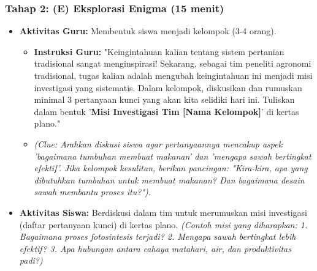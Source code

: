 \documentclass[a4paper,12pt]{article}
\begin{document}
\subsubsection{Tahap 2: (E) Eksplorasi Enigma (15 menit)}
\begin{itemize}
\item \textbf{Aktivitas Guru:} Membentuk siswa menjadi kelompok (3-4 orang).
    \begin{itemize}
    \item \textbf{Instruksi Guru:} "Keingintahuan kalian tentang sistem pertanian tradisional sangat menginspirasi! Sekarang, sebagai tim peneliti agronomi tradisional, tugas kalian adalah mengubah keingintahuan ini menjadi misi investigasi yang sistematis. Dalam kelompok, diskusikan dan rumuskan minimal 3 pertanyaan kunci yang akan kita selidiki hari ini. Tuliskan dalam bentuk '\textbf{Misi Investigasi Tim [Nama Kelompok]}' di kertas plano."
    \item \textit{(Clue: Arahkan diskusi siswa agar pertanyaannya mencakup aspek 'bagaimana tumbuhan membuat makanan' dan 'mengapa sawah bertingkat efektif'. Jika kelompok kesulitan, berikan pancingan: "Kira-kira, apa yang dibutuhkan tumbuhan untuk membuat makanan? Dan bagaimana desain sawah membantu proses itu?").}
    \end{itemize}
\item \textbf{Aktivitas Siswa:} Berdiskusi dalam tim untuk merumuskan misi investigasi (daftar pertanyaan kunci) di kertas plano. \textit{(Contoh misi yang diharapkan: 1. Bagaimana proses fotosintesis terjadi? 2. Mengapa sawah bertingkat lebih efektif? 3. Apa hubungan antara cahaya matahari, air, dan produktivitas padi?)}
\end{itemize}
\end{document}
